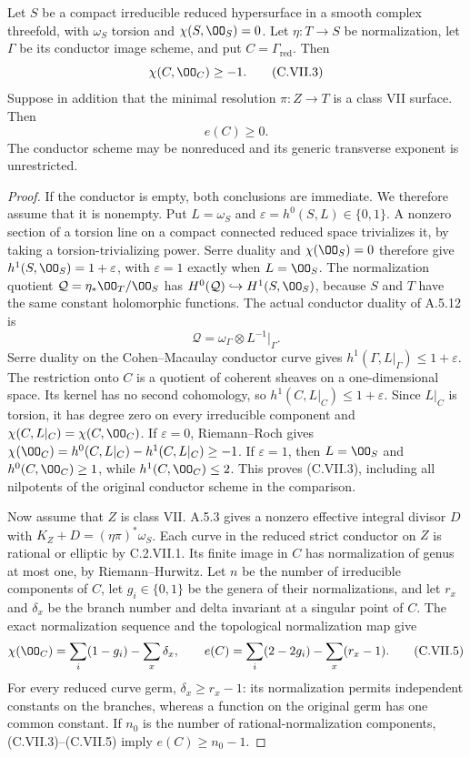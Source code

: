 \begin{lemma}
\label{st:C.2.VII.2}
Let $S$ be a compact irreducible reduced hypersurface in
a smooth complex threefold, with $\omega_S$ torsion and
$\chi(S,\OO_S)=0$. Let $\eta:T\to S$ be normalization,
let $\Gamma$ be its conductor image scheme, and put
$C=\Gamma_{\mathrm{red}}$. Then
\[
 \chi(C,\OO_C)\ge-1.
\tag{C.VII.3}
\]
Suppose in addition that the minimal resolution
$\pi:Z\to T$ is a class VII surface. Then
\[
 e(C)\ge0.
\tag{C.VII.4}
\]
The conductor scheme may be nonreduced and its generic
transverse exponent is unrestricted.
\end{lemma}
\begin{proof}
If the conductor is empty, both conclusions are immediate.
We therefore assume that it is nonempty.
Put $L=\omega_S$ and
$\varepsilon=h^0(S,L)\in\{0,1\}$.
A nonzero section of a torsion line on a compact
connected reduced space trivializes it, by taking a
torsion-trivializing power. Serre duality and
$\chi(\OO_S)=0$ therefore give
$h^1(S,\OO_S)=1+\varepsilon$, with
$\varepsilon=1$ exactly when $L=\OO_S$.
The normalization quotient
$\mathcal Q=\eta_*\OO_T/\OO_S$ has
$H^0(\mathcal Q)\hookrightarrow H^1(S,\OO_S)$,
because $S$ and $T$ have the same constant holomorphic
functions. The actual conductor duality of A.5.12 is
\[
 \mathcal Q=\omega_\Gamma\otimes L^{-1}|_\Gamma .
\]
Serre duality on the Cohen--Macaulay conductor curve
gives $h^1(\Gamma,L|_\Gamma)\le1+\varepsilon$.
The restriction onto $C$ is a quotient of coherent
sheaves on a one-dimensional space. Its kernel has
no second cohomology, so
$h^1(C,L|_C)\le1+\varepsilon$.
Since $L|_C$ is torsion, it has degree zero on every
irreducible component and
$\chi(C,L|_C)=\chi(C,\OO_C)$.
If $\varepsilon=0$, Riemann--Roch gives
$\chi(\OO_C)=h^0(C,L|_C)-h^1(C,L|_C)\ge-1$.
If $\varepsilon=1$, then $L=\OO_S$ and
$h^0(C,\OO_C)\ge1$, while $h^1(C,\OO_C)\le2$.
This proves (C.VII.3), including all nilpotents of
the original conductor scheme in the comparison.

Now assume that $Z$ is class VII. A.5.3 gives a
nonzero effective integral divisor $D$ with
$K_Z+D=(\eta\pi)^*\omega_S$.
Each curve in the reduced strict conductor on $Z$
is rational or elliptic by C.2.VII.1. Its finite image
in $C$ has normalization of genus at most one, by
Riemann--Hurwitz. Let $n$ be the number of irreducible
components of $C$, let $g_i\in\{0,1\}$ be the genera
of their normalizations, and let $r_x$ and $\delta_x$
be the branch number and delta invariant at a singular
point of $C$. The exact normalization sequence and
the topological normalization map give
\[
 \chi(\OO_C)=\sum_i(1-g_i)-\sum_x\delta_x,\qquad
 e(C)=\sum_i(2-2g_i)-\sum_x(r_x-1).
\tag{C.VII.5}
\]
For every reduced curve germ,
$\delta_x\ge r_x-1$: its normalization permits
independent constants on the branches, whereas a
function on the original germ has one common constant.
If $n_0$ is the number of rational-normalization
components, (C.VII.3)--(C.VII.5) imply
$e(C)\ge n_0-1$.


\end{proof}
